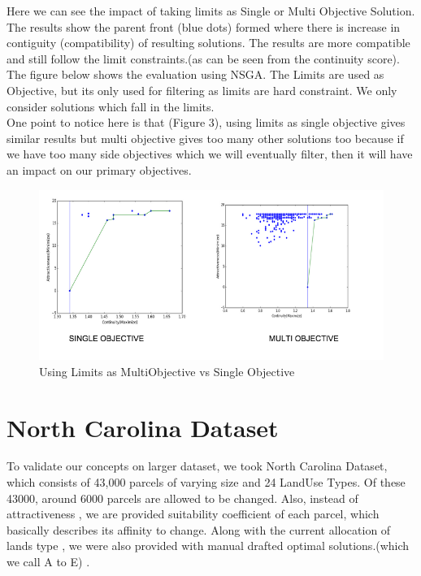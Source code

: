 \documentclass{sig-alternate}
\begin{document}
Here we can see the impact of taking limits as Single or Multi Objective Solution.
The results show the parent front (blue dots) formed where there is increase in contiguity (compatibility) of resulting solutions. The results are more compatible and still follow the limit constraints.(as can be seen from the continuity score). \\[.25cm]

The figure below shows the evaluation using NSGA. The  Limits are used as Objective, but its only used for filtering as limits are hard constraint. We only consider solutions which fall in the limits. \\
 One point to notice here is that (Figure 3), using limits as single objective gives similar results but multi objective gives too many other solutions too because if we have too many side objectives which we will eventually filter, then it will have an impact on our primary objectives.\\


\begin{figure}[h]
\begin{center}
\includegraphics[width=4.in]{svd.png}
\caption{Using Limits as MultiObjective vs Single Objective}
\end{center}
\end{figure}

\section{North Carolina Dataset}

To validate our concepts on larger dataset, we took North Carolina Dataset, which consists of 43,000 parcels of varying size and 24 LandUse Types. Of these 43000, around 6000 parcels are allowed to be changed. Also, instead of attractiveness , we are provided suitability coefficient of each parcel, which basically describes its affinity to change. Along with the current allocation of lands type , we were also provided with manual drafted optimal solutions.(which we call A to E) . \\
\end{document}
